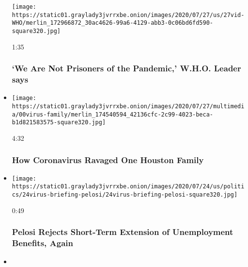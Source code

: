 \begin{itemize}
  \texttt{[image: https://static01.graylady3jvrrxbe.onion/images/2020/07/27/us/27vid-WHO/merlin\_172966872\_30ac4626-99a6-4129-abb3-0c06bd6fd590-square320.jpg]}

  1:35

  \hypertarget{we-are-not-prisoners-of-the-pandemic-who-leader-says}{%
  \subsubsection{`We Are Not Prisoners of the Pandemic,' W.H.O. Leader
  says}\label{we-are-not-prisoners-of-the-pandemic-who-leader-says}}
\item
  \href{https://www.nytimes3xbfgragh.onion/video/us/100000007253343/coronavirus-houston-family.html?action=click\&module=video-series-bar\&region=header\&pgtype=Article\&playlistId=video/coronavirus-news-update}{}

  \texttt{[image: https://static01.graylady3jvrrxbe.onion/images/2020/07/27/multimedia/00virus-family/merlin\_174540594\_42136cfc-2c99-4023-beca-b1d821583575-square320.jpg]}

  4:32

  \hypertarget{how-coronavirus-ravaged-one-houston-family}{%
  \subsubsection{How Coronavirus Ravaged One Houston
  Family}\label{how-coronavirus-ravaged-one-houston-family}}
\item
  \href{https://www.nytimes3xbfgragh.onion/video/us/100000007256158/pelosi-rejects-unemployment-extension.html?action=click\&module=video-series-bar\&region=header\&pgtype=Article\&playlistId=video/coronavirus-news-update}{}

  \texttt{[image: https://static01.graylady3jvrrxbe.onion/images/2020/07/24/us/politics/24virus-briefing-pelosi/24virus-briefing-pelosi-square320.jpg]}

  0:49

  \hypertarget{pelosi-rejects-short-term-extension-of-unemployment-benefits-again}{%
  \subsubsection{Pelosi Rejects Short-Term Extension of Unemployment
  Benefits,
  Again}\label{pelosi-rejects-short-term-extension-of-unemployment-benefits-again}}
\item
  \href{https://www.nytimes3xbfgragh.onion/video/world/100000007253595/world-health-organization-pompeo-china.html?action=click\&module=video-series-bar\&region=header\&pgtype=Article\&playlistId=video/coronavirus-news-update}{}


\end{itemize}
